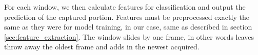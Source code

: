 For each window, we then calculate features for classification and output the prediction of the captured portion. Features must be preprocessed exactly the same as they were for model training, in our case, same as described in section \ref{sec:feature_extraction}. The window slides by one frame, in other words leaves throw away the oldest frame and adds in the newest acquired.

